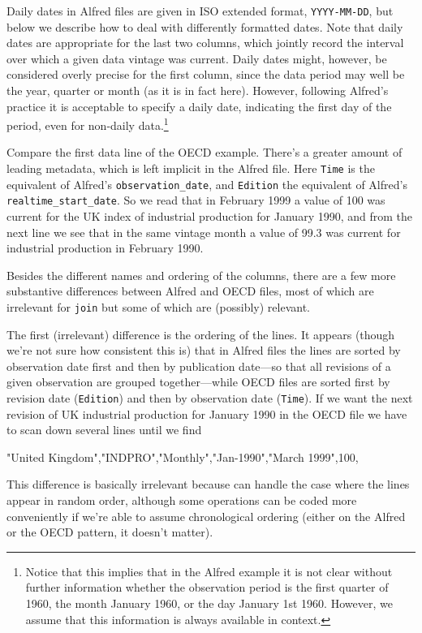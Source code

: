 Daily dates in Alfred files are given in ISO extended format,
\texttt{YYYY-MM-DD}, but below we describe how to deal with
differently formatted dates. Note that daily dates are appropriate for
the last two columns, which jointly record the interval over which a
given data vintage was current. Daily dates might, however, be
considered overly precise for the first column, since the data period
may well be the year, quarter or month (as it is in fact
here). However, following Alfred's practice it is acceptable to
specify a daily date, indicating the first day of the period, even for
non-daily data.\footnote{Notice that this implies that in the Alfred
  example it is not clear without further information whether the
  observation period is the first quarter of 1960, the month January
  1960, or the day January 1st 1960.  However, we assume that this
  information is always available in context.}

Compare the first data line of the OECD example. There's a greater
amount of leading metadata, which is left implicit in the Alfred
file. Here \texttt{Time} is the equivalent of Alfred's
\verb|observation_date|, and \texttt{Edition} the equivalent of
Alfred's \verb|realtime_start_date|. So we read that in February 1999
a value of 100 was current for the UK index of industrial production
for January 1990, and from the next line we see that in the same
vintage month a value of 99.3 was current for industrial production in
February 1990.

Besides the different names and ordering of the columns, there are a
few more substantive differences between Alfred and OECD files, most
of which are irrelevant for \texttt{join} but some of which are
(possibly) relevant.

The first (irrelevant) difference is the ordering of the lines. It
appears (though we're not sure how consistent this is) that in Alfred
files the lines are sorted by observation date first and then by
publication date---so that all revisions of a given observation are
grouped together---while OECD files are sorted first by revision date
(\texttt{Edition}) and then by observation date (\texttt{Time}). If we
want the next revision of UK industrial production for January 1990 in
the OECD file we have to scan down several lines until we find
\begin{code}
"United Kingdom","INDPRO","Monthly","Jan-1990","March 1999",100,
\end{code}
This difference is basically irrelevant because  can
handle the case where the lines appear in random order, although some
operations can be coded more conveniently if we're able to assume
chronological ordering (either on the Alfred or the OECD pattern, it
doesn't matter).

